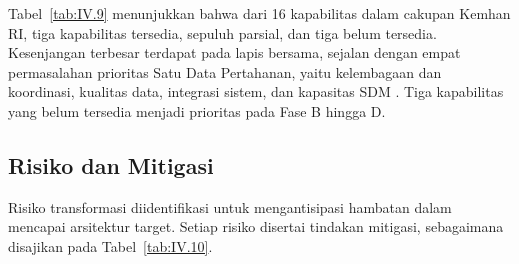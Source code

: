 Tabel~\ref{tab:IV.9} menunjukkan bahwa dari 16 kapabilitas dalam cakupan Kemhan RI, tiga kapabilitas tersedia, sepuluh parsial, dan tiga belum tersedia. Kesenjangan terbesar terdapat pada lapis bersama, sejalan dengan empat permasalahan prioritas Satu Data Pertahanan, yaitu kelembagaan dan koordinasi, kualitas data, integrasi sistem, dan kapasitas SDM \cite{Pusdatin2026SatuData}. Tiga kapabilitas yang belum tersedia menjadi prioritas pada Fase B hingga D.

\subsection{Risiko dan Mitigasi}
\label{sec:IV.3.4}

Risiko transformasi diidentifikasi untuk mengantisipasi hambatan dalam mencapai arsitektur target. Setiap risiko disertai tindakan mitigasi, sebagaimana disajikan pada Tabel~\ref{tab:IV.10}.

